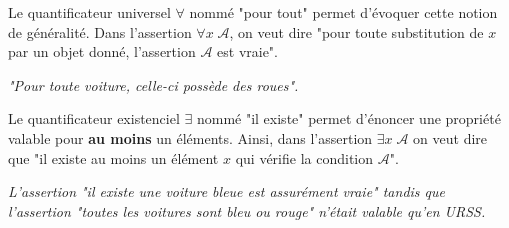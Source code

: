 \begin{definition}
    Le quantificateur universel $\forall$ nommé "pour tout" permet d'évoquer cette notion de généralité. 
    Dans l'assertion $\forall x \; \mathcal{A}$, on veut dire "pour toute substitution de $x$ par un objet donné, l'assertion 
    $\mathcal{A}$ est vraie". 
\end{definition}

\begin{example}
    \emph{"Pour toute voiture, celle-ci possède des roues".}
\end{example}

\begin{definition}
    Le quantificateur existenciel $ \exists$ nommé "il existe" permet d'énoncer une propriété 
    valable pour \textbf{au moins} un éléments. 
    Ainsi, dans l'assertion $ \exists x \; \mathcal{A}$ on veut dire que "il existe au moins un élément $x$ qui vérifie la condition $ \mathcal{A}$". 
\end{definition}

\begin{example}
    \emph{L'assertion "il existe une voiture bleue est assurément vraie" tandis que l'assertion "toutes les voitures sont bleu 
    ou rouge" n'était valable qu'en URSS. }
\end{example}







